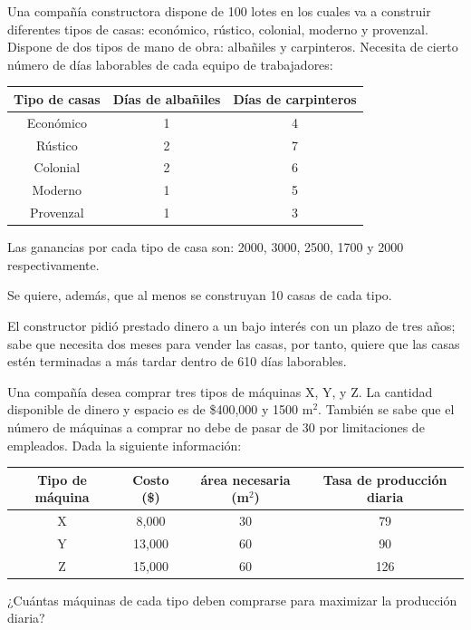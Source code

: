 \begin{Ejer}
Una compa\~n\'ia constructora dispone de 100 lotes en los cuales va a construir diferentes tipos de casas: econ\'omico, r\'ustico, colonial, moderno y provenzal. Dispone de dos tipos de mano de obra: alba\~niles y carpinteros. Necesita de cierto n\'umero de d\'ias laborables de cada equipo de trabajadores:

\begin{center}
\begin{tabular}{c|cc}
Tipo de casas & D\'ias de alba\~niles & D\'ias de carpinteros \\
\hline
Econ\'omico & 1 & 4 \\
R\'ustico & 2 & 7 \\
Colonial & 2 & 6 \\
Moderno & 1 & 5 \\
Provenzal & 1 & 3 \\
\end{tabular}
\end{center}

Las ganancias por cada tipo de casa son: 2000, 3000, 2500, 1700 y 2000 respectivamente.

Se quiere, adem\'as, que al menos se construyan 10 casas de cada tipo.

El constructor pidi\'o prestado dinero a un bajo inter\'es con un plazo de tres a\~nos; sabe que necesita dos meses para vender las casas, por tanto, quiere que las casas est\'en terminadas a m\'as tardar dentro de 610 d\'ias laborables.

\end{Ejer}

\begin{Ejer} Una compa\~n\'ia desea comprar tres tipos de m\'aquinas X, Y, y Z. La cantidad disponible de dinero y espacio es de \$400,000 y 1500 m$^2$. Tambi\'en se sabe que el n\'umero de m\'aquinas a comprar no debe de pasar de 30 por limitaciones de empleados. Dada la siguiente informaci\'on:

\begin{center}
\begin{tabular}{c|ccc}
Tipo de m\'aquina & Costo (\$) & \'area necesaria (m$^2$) & Tasa de producci\'on diaria \\
\hline
X & 8,000 & 30 & 79 \\
Y & 13,000 & 60 & 90 \\
Z & 15,000 & 60 & 126 \\
\end{tabular}
\end{center}

¿Cu\'antas m\'aquinas de cada tipo deben comprarse para maximizar la producci\'on diaria?

\end{Ejer}

